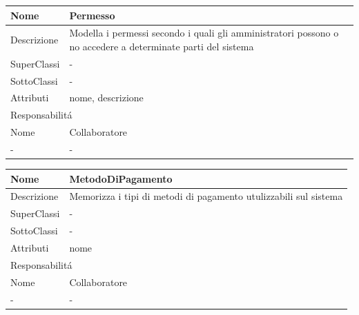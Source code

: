 \begin{center} %
    \begin{longtable}{ |p{3cm}|p{3cm}|p{3cm}|p{3cm}| }
        \hline
        Nome & \multicolumn{3}{|p{9cm}|}{Permesso} \\\hline
        Descrizione & \multicolumn{3}{|p{9cm}|}{Modella i permessi secondo i quali gli amministratori possono o no accedere a determinate parti del sistema} \\\hline
        SuperClassi & \multicolumn{3}{|p{9cm}|}{-} \\\hline
        SottoClassi & \multicolumn{3}{|p{9cm}|}{-} \\\hline
        Attributi & \multicolumn{3}{|p{9cm}|}{nome, descrizione} \\\hline
        \multicolumn{4}{|p{12cm}|}{Responsabilit\'a} \\\hline %
        \multicolumn{2}{|p{6cm}|}{Nome} & \multicolumn{2}{|p{6cm}|}{Collaboratore} \\\hline %
        \multicolumn{2}{|p{6cm}|}{-} & \multicolumn{2}{|p{6cm}|}{-} \\\hline
    \end{longtable}
\end{center}

\begin{center} %
    \begin{longtable}{ |p{3cm}|p{3cm}|p{3cm}|p{3cm}| }
        \hline
        Nome & \multicolumn{3}{|p{9cm}|}{MetodoDiPagamento} \\\hline
        Descrizione & \multicolumn{3}{|p{9cm}|}{Memorizza i tipi di metodi di pagamento utulizzabili sul sistema} \\\hline
        SuperClassi & \multicolumn{3}{|p{9cm}|}{-} \\\hline
        SottoClassi & \multicolumn{3}{|p{9cm}|}{-} \\\hline
        Attributi & \multicolumn{3}{|p{9cm}|}{nome} \\\hline
        \multicolumn{4}{|p{12cm}|}{Responsabilit\'a} \\\hline %
        \multicolumn{2}{|p{6cm}|}{Nome} & \multicolumn{2}{|p{6cm}|}{Collaboratore} \\\hline %
        \multicolumn{2}{|p{6cm}|}{-} & \multicolumn{2}{|p{6cm}|}{-} \\\hline
    \end{longtable}
\end{center}


